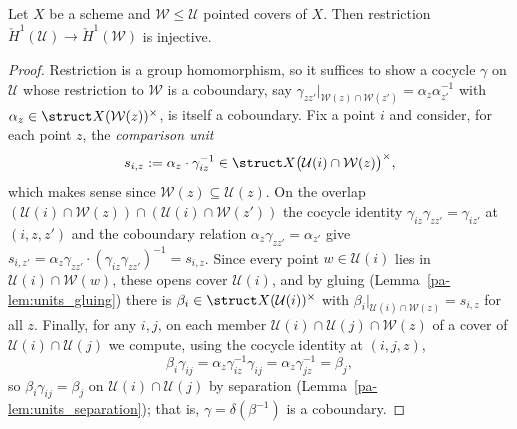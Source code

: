 \begin{theorem}
  \label{pa-thm:unitsRes_injective}
  \leanok

  Let \(X\) be a scheme and \(\mathcal W \le \mathcal U\) pointed covers of \(X\). Then
  restriction \(\check H^1(\mathcal U) \to \check H^1(\mathcal W)\) is injective.
\end{theorem}
\begin{proof}
  \leanok
  Restriction is a group homomorphism, so it suffices to show a cocycle \(\gamma\) on
  \(\mathcal U\) whose restriction to \(\mathcal W\) is a coboundary, say
  \(\gamma_{zz'}|_{\mathcal W(z) \cap \mathcal W(z')} = \alpha_z \alpha_{z'}^{-1}\) with
  \(\alpha_z \in \struct X(\mathcal W(z))^{\times}\), is itself a coboundary. Fix a point
  \(i\) and consider, for each point \(z\), the \emph{comparison unit}
  \[ s_{i,z} := \alpha_z \cdot \gamma_{iz}^{-1}
     \in \struct X\bigl(\mathcal U(i) \cap \mathcal W(z)\bigr)^{\times}, \]
  which makes sense since \(\mathcal W(z) \subseteq \mathcal U(z)\). On the overlap
  \((\mathcal U(i) \cap \mathcal W(z)) \cap (\mathcal U(i) \cap \mathcal W(z'))\) the cocycle
  identity \(\gamma_{iz}\gamma_{zz'} = \gamma_{iz'}\) at \((i,z,z')\) and the coboundary
  relation \(\alpha_z \gamma_{zz'} = \alpha_{z'}\) give
  \(s_{i,z'} = \alpha_z\gamma_{zz'}\cdot(\gamma_{iz}\gamma_{zz'})^{-1} = s_{i,z}\). Since
  every point \(w \in \mathcal U(i)\) lies in \(\mathcal U(i) \cap \mathcal W(w)\), these
  opens cover \(\mathcal U(i)\), and by gluing (Lemma~\ref{pa-lem:units_gluing}) there is
  \(\beta_i \in \struct X(\mathcal U(i))^{\times}\) with
  \(\beta_i|_{\mathcal U(i) \cap \mathcal W(z)} = s_{i,z}\) for all \(z\). Finally, for any
  \(i, j\), on each member \(\mathcal U(i) \cap \mathcal U(j) \cap \mathcal W(z)\) of a cover
  of \(\mathcal U(i) \cap \mathcal U(j)\) we compute, using the cocycle identity at
  \((i,j,z)\),
  \[ \beta_i \gamma_{ij} = \alpha_z \gamma_{iz}^{-1}\gamma_{ij}
       = \alpha_z \gamma_{jz}^{-1} = \beta_j , \]
  so \(\beta_i \gamma_{ij} = \beta_j\) on \(\mathcal U(i) \cap \mathcal U(j)\) by separation
  (Lemma~\ref{pa-lem:units_separation}); that is, \(\gamma = \delta(\beta^{-1})\) is a
  coboundary.
\end{proof}

